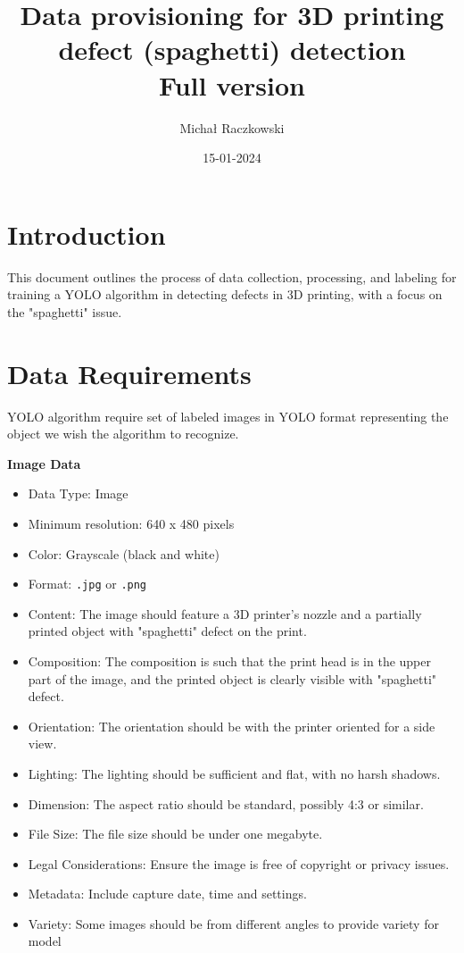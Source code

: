 \documentclass[12pt,a4paper]{article}
\title{{\textbf{Data provisioning for 3D printing defect (spaghetti) detection}\\ {\small Full version}}}
\author{Michał Raczkowski}
\date{15-01-2024}
\begin{document}
\maketitle
\thispagestyle{empty} %

\newpage
\tableofcontents
\newpage

\setcounter{page}{1} %

\section{Introduction}
This document outlines the process of data collection, processing, and labeling for training a YOLO algorithm in detecting defects in 3D printing, with a focus on the "spaghetti" issue.

\section{Data Requirements}
YOLO algorithm require set of labeled images in YOLO format representing the object we wish the algorithm to recognize. 
\smallbreak

\noindent\textbf{Image Data}
\begin{itemize}
    \item Data Type: Image
    \item Minimum resolution: 640 x 480 pixels
    \item Color: Grayscale (black and white)
    \item Format: \verb|.jpg| or \verb|.png| 
    \item Content: The image should feature a 3D printer's nozzle and a partially printed object with "spaghetti" defect on the print.
    \item Composition: The composition is such that the print head is in the upper part of the image, and the printed object is clearly visible with "spaghetti" defect.
    \item Orientation: The orientation should be with the printer oriented for a side view.
    \item Lighting: The lighting should be sufficient and flat, with no harsh shadows.
    \item Dimension: The aspect ratio should be standard, possibly 4:3 or similar.
    \item File Size: The file size should be under one megabyte.
    \item Legal Considerations: Ensure the image is free of copyright or privacy issues.
    \item Metadata: Include capture date, time and settings.
    \item Variety: Some images should be from different angles to provide variety for model 
\end{itemize}
\end{document}
